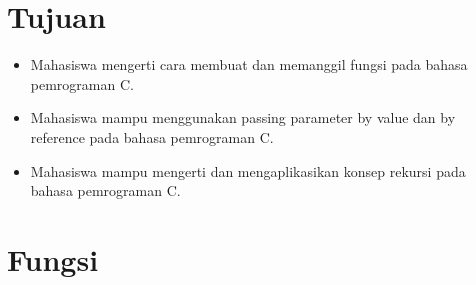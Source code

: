 \section*{Tujuan}
\begin{itemize}[label=$\bullet$, itemsep=-1pt, leftmargin=*]
    \item Mahasiswa mengerti cara membuat dan memanggil fungsi pada bahasa pemrograman C.
    \item Mahasiswa mampu menggunakan passing parameter by value dan by reference pada bahasa pemrograman C.
    \item Mahasiswa mampu mengerti dan mengaplikasikan konsep rekursi pada bahasa pemrograman C.
\end{itemize}

\section{Fungsi}

